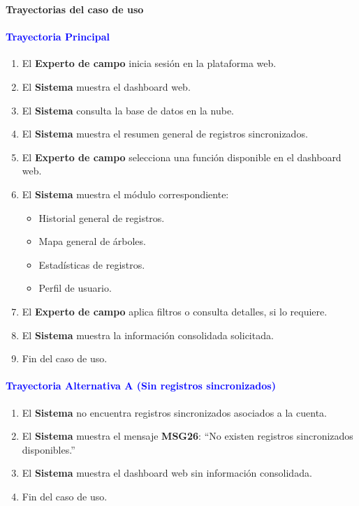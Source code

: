 {\large {\textbf{Trayectorias del caso de uso}}}

\vspace{0.5em}
\paragraph{\textbf{\textcolor{blue}{Trayectoria Principal}}}

\begin{enumerate}
    \item El \textbf{Experto de campo} inicia sesión en la plataforma web.
    \item El \textbf{Sistema} muestra el dashboard web.
    \item El \textbf{Sistema} consulta la base de datos en la nube.
    \item El \textbf{Sistema} muestra el resumen general de registros sincronizados.
    \item El \textbf{Experto de campo} selecciona una función disponible en el dashboard web.
    \item El \textbf{Sistema} muestra el módulo correspondiente:
    \begin{itemize}
        \item Historial general de registros.
        \item Mapa general de árboles.
        \item Estadísticas de registros.
        \item Perfil de usuario.
    \end{itemize}
    \item El \textbf{Experto de campo} aplica filtros o consulta detalles, si lo requiere.
    \item El \textbf{Sistema} muestra la información consolidada solicitada.
    \item Fin del caso de uso.
\end{enumerate}

\paragraph{\textbf{\textcolor{blue}{Trayectoria Alternativa A (Sin registros sincronizados)}}}
\begin{enumerate}
    \item El \textbf{Sistema} no encuentra registros sincronizados asociados a la cuenta.
    \item El \textbf{Sistema} muestra el mensaje \textbf{MSG26}: ``No existen registros sincronizados disponibles.''
    \item El \textbf{Sistema} muestra el dashboard web sin información consolidada.
    \item Fin del caso de uso.
\end{enumerate}

